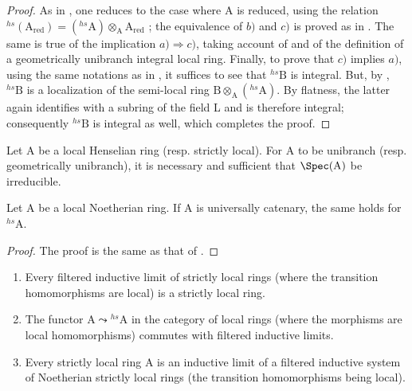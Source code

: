 \begin{proof}
As in , one reduces to the case where A is reduced, using the relation ${}^{hs}(\mathrm{A}_{\mathrm{red}})=({}^{hs}\!\mathrm{A})\otimes_{\mathrm{A}}\mathrm{A}_{\mathrm{red}}$ ; the equivalence of $b)$ and $c)$ is proved as in .  The same is true of the implication $a)\Rightarrow c)$, taking account of  and of the definition of a geometrically unibranch integral local ring.
Finally, to prove that $c)$ implies $a)$, using the same notations as in , it suffices to see that ${}^{hs}\!\mathrm{B}$ is integral.
But, by , ${}^{hs}\!\mathrm{B}$ is a localization of the semi-local ring $\mathrm{B}\otimes_{\mathrm{A}}({}^{hs}\!\mathrm{A})$.  By flatness, the latter again identifies with a subring of the field L and is therefore integral; consequently ${}^{hs}\!\mathrm{B}$ is integral as well, which completes the proof.
\end{proof}

\begin{corollary}[18.8.16]
\label{IV.18.8.16}
Let $\mathrm{A}$ be a local Henselian ring (resp. strictly local).
For A to be unibranch (resp. geometrically unibranch), it is necessary and sufficient that $\Spec(\mathrm{A})$ be irreducible.
\end{corollary}


\begin{proposition}[18.8.17]
\label{IV.18.8.17}
Let $\mathrm{A}$ be a local Noetherian ring.
If A is universally catenary, the same holds for ${}^{hs}\!\mathrm{A}$.
\end{proposition}

\begin{proof}
The proof is the same as that of .
\end{proof}

\begin{proposition}[18.8.18]
\label{IV.18.8.18}
\begin{enumerate}[label=\emph{\roman*)}]
  \item Every filtered inductive limit of strictly local rings (where the transition homomorphisms are local) is a strictly local ring.
  \item The functor $\mathrm{A}\leadsto{}^{hs}\!\mathrm{A}$ in the category of local rings (where the morphisms are local homomorphisms) commutes with filtered inductive limits.
  \item Every strictly local ring A is an inductive limit of a filtered inductive system of Noetherian strictly local rings (the transition homomorphisms being local).
\end{enumerate}
\end{proposition}

